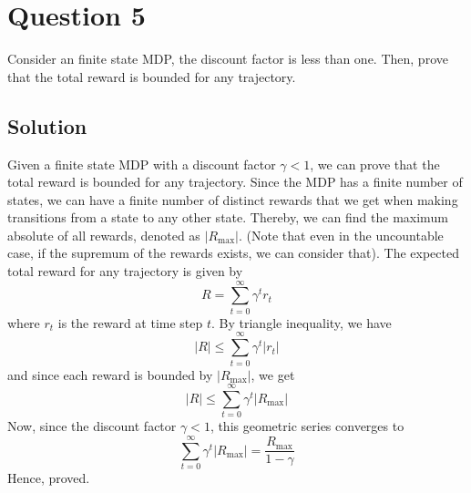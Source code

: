 \section*{Question 5}\label{sec:q5}

Consider an finite state MDP, the discount factor is less than one.
Then, prove that the total reward is bounded for any trajectory.

\subsection*{Solution}

Given a finite state MDP with a discount factor \( \gamma < 1 \), we can prove that the total reward is bounded for any trajectory.
Since the MDP has a finite number of states, we can have a finite number of distinct rewards that we get when making transitions from a state to any other state.
Thereby, we can find the maximum absolute of all rewards, denoted as \( \vert R_{\text{max}} \vert \).
(Note that even in the uncountable case, if the supremum of the rewards exists, we can consider that).
The expected total reward for any trajectory is given by
\[
    R = \sum_{t=0}^{\infty} \gamma^t r_t
\]
where \( r_t \) is the reward at time step \( t \).
By triangle inequality, we have
\[
    \vert R \vert \leq \sum_{t=0}^{\infty} \gamma^t \vert r_t \vert
\]
and since each reward is bounded by \( \vert R_{\text{max}} \vert \), we get
\[
    \vert R \vert \leq \sum_{t=0}^{\infty} \gamma^t \vert R_{\text{max}} \vert
\]
Now, since the discount factor \( \gamma < 1 \), this geometric series converges to
\[
    \sum_{t=0}^{\infty} \gamma^t \vert R_{\text{max}} \vert = \frac{R_{\text{max}}}{1 - \gamma}
\]
Hence, proved.
